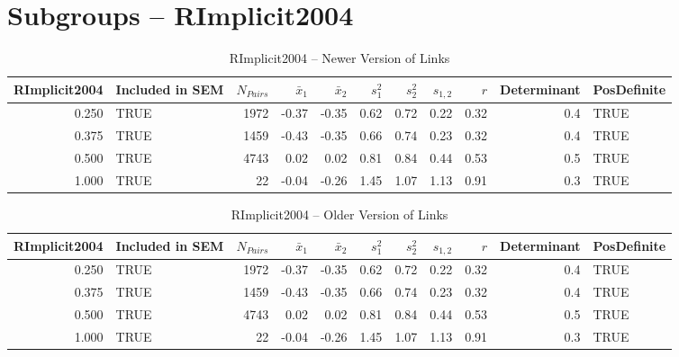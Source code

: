 \documentclass{article}\usepackage[]{graphicx}\usepackage[]{color}
\begin{document}
\section{Subgroups --  RImplicit2004 }%
\begin{table}[ht]
\centering
\begin{tabular}{rlrrrrrrrrl}
  \hline
RImplicit2004 & Included in SEM & $N_{Pairs}$ & $\bar{x}_1$ & $\bar{x}_2$ & $s_1^2$ & $s_2^2$ & $s_{1,2}$ & $r$ & Determinant & PosDefinite \\ 
  \hline
0.250 & TRUE & 1972 & -0.37 & -0.35 & 0.62 & 0.72 & 0.22 & 0.32 & 0.4 & TRUE \\ 
  0.375 & TRUE & 1459 & -0.43 & -0.35 & 0.66 & 0.74 & 0.23 & 0.32 & 0.4 & TRUE \\ 
  0.500 & TRUE & 4743 & 0.02 & 0.02 & 0.81 & 0.84 & 0.44 & 0.53 & 0.5 & TRUE \\ 
  1.000 & TRUE & 22 & -0.04 & -0.26 & 1.45 & 1.07 & 1.13 & 0.91 & 0.3 & TRUE \\ 
   \hline
\end{tabular}
\caption{RImplicit2004 -- Newer Version of Links} 
\end{table}
\begin{table}[ht]
\centering
\begin{tabular}{rlrrrrrrrrl}
  \hline
RImplicit2004 & Included in SEM & $N_{Pairs}$ & $\bar{x}_1$ & $\bar{x}_2$ & $s_1^2$ & $s_2^2$ & $s_{1,2}$ & $r$ & Determinant & PosDefinite \\ 
  \hline
0.250 & TRUE & 1972 & -0.37 & -0.35 & 0.62 & 0.72 & 0.22 & 0.32 & 0.4 & TRUE \\ 
  0.375 & TRUE & 1459 & -0.43 & -0.35 & 0.66 & 0.74 & 0.23 & 0.32 & 0.4 & TRUE \\ 
  0.500 & TRUE & 4743 & 0.02 & 0.02 & 0.81 & 0.84 & 0.44 & 0.53 & 0.5 & TRUE \\ 
  1.000 & TRUE & 22 & -0.04 & -0.26 & 1.45 & 1.07 & 1.13 & 0.91 & 0.3 & TRUE \\ 
   \hline
\end{tabular}
\caption{RImplicit2004 -- Older Version of Links} 
\end{table}


\end{document}

